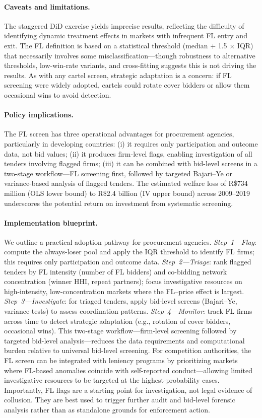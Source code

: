 \paragraph{Caveats and limitations.}
The staggered DiD exercise yields imprecise results, reflecting the
difficulty of identifying dynamic treatment effects in markets with
infrequent FL entry and exit. The FL definition is based on a
statistical threshold (median + 1.5 $\times$ IQR) that necessarily
involves some misclassification---though robustness to alternative
thresholds, low-win-rate variants, and cross-fitting suggests this is
not driving the results. As with any cartel screen, strategic adaptation
is a concern: if FL screening were widely adopted, cartels could rotate
cover bidders or allow them occasional wins to avoid detection.

\paragraph{Policy implications.}
The FL screen has three operational advantages for procurement agencies,
particularly in developing countries: (i) it requires only participation
and outcome data, not bid values; (ii) it produces firm-level flags,
enabling investigation of all tenders involving flagged firms; (iii) it
can be combined with bid-level screens in a two-stage workflow---FL
screening first, followed by targeted Bajari--Ye or variance-based
analysis of flagged tenders. The estimated welfare loss of R\$734 million (OLS lower bound) to
R\$2.4 billion (IV upper bound) across 2009--2019 underscores the
potential return on investment from systematic screening.

\paragraph{Implementation blueprint.}
We outline a practical adoption pathway for procurement agencies.
\emph{Step~1---Flag}: compute the always-loser pool and apply the IQR
threshold to identify FL firms; this requires only participation and
outcome data. \emph{Step~2---Triage}: rank flagged tenders by FL
intensity (number of FL bidders) and co-bidding network concentration
(winner HHI, repeat partners); focus investigative resources on
high-intensity, low-concentration markets where the FL--price effect is
largest. \emph{Step~3---Investigate}: for triaged tenders, apply
bid-level screens (Bajari--Ye, variance tests) to assess coordination
patterns. \emph{Step~4---Monitor}: track FL firms across time to detect
strategic adaptation (e.g., rotation of cover bidders, occasional
wins). This two-stage workflow---firm-level screening followed by
targeted bid-level analysis---reduces the data requirements and
computational burden relative to universal bid-level screening.
For competition authorities, the FL screen can be integrated with
leniency programs by prioritizing markets where FL-based anomalies
coincide with self-reported conduct---allowing limited investigative
resources to be targeted at the highest-probability cases. Importantly,
FL flags are a starting point for investigation, not legal evidence of
collusion. They are best used to trigger further audit and bid-level
forensic analysis rather than as standalone grounds for enforcement
action.

